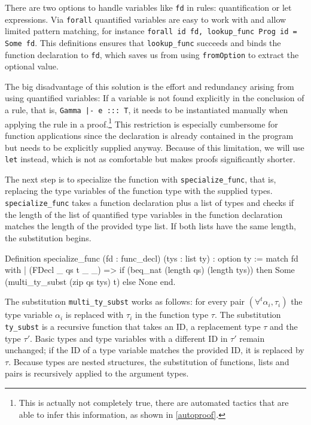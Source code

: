 \documentclass[paper = a4, fleqn, abstract=on, twoside]{scrreprt}
\newcommand{\coqinline}[1]{\texttt{#1}}
\begin{document}
There are two options to handle variables like \texttt{fd} in rules: quantification or let expressions. Via \coqinline{forall} quantified variables are easy to work with and allow limited pattern matching, for instance \coqinline{forall id fd, lookup_func Prog id = Some fd}. This definitions ensures that \coqinline{lookup_func} succeeds and binds the function declaration to \coqinline{fd}, which saves us from using \coqinline{fromOption} to extract the optional value.
\par
The big disadvantage of this solution is the effort and redundancy arising from using quantified variables: If a variable is not found explicitly in the conclusion of a rule, that is, \coqinline{Gamma |- e ::: T}, it needs to be instantiated manually when applying the rule in a proof.\footnote{This is actually not completely true, there are automated tactics that are able to infer this information, as shown in \autoref{autoproof}.} This restriction is especially cumbersome for function applications since the declaration is already contained in the program but needs to be explicitly supplied anyway. Because of this limitation, we will use \coqinline{let} instead, which is not as comfortable but makes proofs significantly shorter.\\
\par \noindent
The next step is to specialize the function with \coqinline{specialize_func}, that is, replacing the type variables of the function type with the supplied types. \coqinline{specialize_func} takes a function declaration plus a list of types and checks if the length of the list of quantified type variables in the function declaration matches the length of the provided type list. If both lists have the same length, the substitution begins.
\begin{coqcode}
Definition specialize_func (fd : func_decl) (tys : list ty) : option ty := 
  match fd with
  | (FDecl _ qs t _ _) => if (beq_nat (length qs) (length tys))
                          then Some (multi_ty_subst (zip qs tys) t)
                          else None
  end.
\end{coqcode}
The substitution \texttt{multi\_ty\_subst} works as follows: for every pair $(\forall^{t}\alpha_{i}, \tau_{i})$ the type variable $\alpha_{i}$ is replaced with $\tau_{i}$ in the function type $\tau$. The substitution \texttt{ty\_subst} is a recursive function that takes an ID, a replacement type $\tau$ and the type $\tau'$. Basic types and type variables with a different ID in $\tau'$ remain unchanged; if the ID of a type variable matches the provided ID, it is replaced by $\tau$. Because types are nested structures, the substitution of functions, lists and pairs is recursively applied to the argument types.
\end{document}
